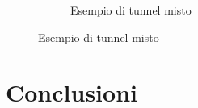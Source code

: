 \begin{figure}[H]
\begin{subfigure}{.33\textwidth}
		\caption{Esempio di tunnel misto}
	\end{subfigure}%
\end{figure}

\section{Conclusioni}